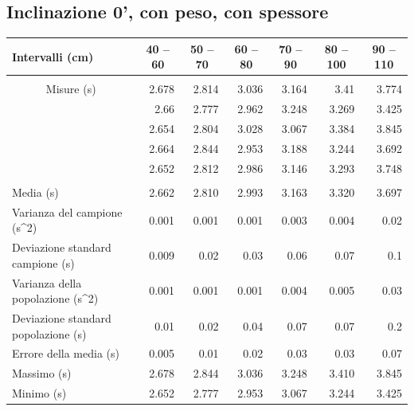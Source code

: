 \documentclass[12pt]{article} %
\begin{document}
	\subsection {Inclinazione 0', con peso, con spessore}
		\begin{table}[H]
			\begin{tabular}{|l|r|r|r|r|r|r|}
			\hline
			Intervalli (cm) & \multicolumn{1}{c|}{40 – 60} & \multicolumn{1}{c|}{50 – 70} & \multicolumn{1}{c|}{60 – 80} & \multicolumn{1}{c|}{70 – 90} & \multicolumn{1}{c|}{80 – 100} & \multicolumn{1}{c|}{90 – 110} \\ \hline
			 & \multicolumn{ 6}{l|}{} \\ \hline
			\multicolumn{ 1}{|c|}{Misure (s)} & 2.678 & 2.814 & 3.036 & 3.164 & 3.41 & 3.774 \\ \cline{ 2- 7}
			\multicolumn{ 1}{|l|}{} & 2.66 & 2.777 & 2.962 & 3.248 & 3.269 & 3.425 \\ \cline{ 2- 7}
			\multicolumn{ 1}{|l|}{} & 2.654 & 2.804 & 3.028 & 3.067 & 3.384 & 3.845 \\ \cline{ 2- 7}
			\multicolumn{ 1}{|l|}{} & 2.664 & 2.844 & 2.953 & 3.188 & 3.244 & 3.692 \\ \cline{ 2- 7}
			\multicolumn{ 1}{|l|}{} & 2.652 & 2.812 & 2.986 & 3.146 & 3.293 & 3.748 \\ \hline
			 & \multicolumn{ 6}{c|}{} \\ \hline
			Media (s) & 2.662 & 2.810 & 2.993 & 3.163 & 3.320 & 3.697 \\ \hline
			Varianza del campione (s^2) & 0.001 & 0.001 & 0.001 & 0.003 & 0.004 & 0.02 \\ \hline
			Deviazione standard campione (s) & 0.009 & 0.02 & 0.03 & 0.06 & 0.07 & 0.1 \\ \hline
			Varianza della popolazione (s^2) & 0.001 & 0.001 & 0.001 & 0.004 & 0.005 & 0.03 \\ \hline
			Deviazione standard popolazione (s) & 0.01 & 0.02 & 0.04 & 0.07 & 0.07 & 0.2 \\ \hline
			Errore della media (s) & 0.005 & 0.01 & 0.02 & 0.03 & 0.03 & 0.07 \\ \hline
			Massimo (s) & 2.678 & 2.844 & 3.036 & 3.248 & 3.410 & 3.845 \\ \hline
			Minimo (s) & 2.652 & 2.777 & 2.953 & 3.067 & 3.244 & 3.425 \\ \hline
			\end{tabular}

		\label{0ap}
		\end{table}
	
\end{document}
